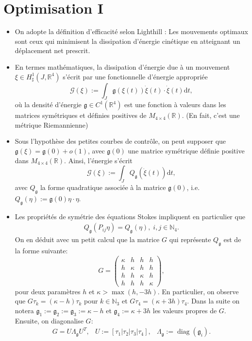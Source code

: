 \documentclass[12pt,a4paper]{article}
\theoremstyle{plain}
\theoremstyle{plain}
\theoremstyle{plain}
\theoremstyle{definition}
\theoremstyle{definition}
\theoremstyle{definition}
\theoremstyle{plain}
\newcommand{\N}{\mathbb{N}}
\newcommand{\R}{\mathbb{R}}
\DeclareMathOperator{\diag}{diag}
\newcommand{\dd}[1]{\mathrm{d}#1}
\begin{document}
\section{Optimisation I}
\begin{itemize}
\item On adopte la définition d'efficacité selon Lighthill \cite{Lighthill1952}: Les mouvements optimaux sont ceux qui minimisent la dissipation d'énergie cinétique en atteignant un déplacement net prescrit.

\item En termes mathématiques, la dissipation d'énergie due à un mouvement $\xi \in H^1_{\sharp}(J, \R^4)$ s'écrit par une fonctionnelle d'énergie appropriée
\begin{equation}
 \mathcal{G}(\xi) := \int_{J} \mathfrak{g}(\xi(t))\dot{\xi}(t) \cdot \dot{\xi}(t) \dd t,
\end{equation}
où la densité d'énergie $\mathfrak{g} \in C^1(\R^4)$ est une fonction à valeurs dans les matrices symétriques et définies positives de $M_{4 \times 4}(\R)$. (En fait, c'est une métrique Riemannienne)

\item Sous l'hypothèse des petites courbes de contrôle, on peut supposer que $\mathfrak{g}(\xi) = \mathfrak{g}(0) + o(1)$, avec $\mathfrak{g}(0)$ une matrice symétrique définie positive dans $M_{4 \times 4}(\R)$. Ainsi, l'énergie s'écrit
\begin{equation}
\label{eq: linearized energy functional}
	\mathcal{G}(\xi) := \int_{J} Q_{\mathfrak{g}}(\dot{\xi}(t))\dd t,
\end{equation}
avec $Q_{\mathfrak{g}}$ la forme quadratique associée à la matrice $\mathfrak{g}(0)$, i.e. $Q_{\mathfrak{g}}(\eta) := \mathfrak{g}(0)\eta \cdot \eta$.

\item Les propriétés de symétrie des équations Stokes impliquent en particulier que
\begin{align}
	Q_{\mathfrak{g}}(P_{ij} \eta) = Q_{\mathfrak{g}}(\eta),\; i,j \in \N_4.
\end{align}
On en déduit avec un petit calcul que la matrice $G$ qui représente $Q_{\mathfrak{g}}$ est de la forme suivante:
\begin{equation}
G = \left ( \begin{array}{cccc}
\kappa & h & h & h \\ 
h & \kappa & h & h \\ 
h & h & \kappa & h \\ 
h & h & h & \kappa
\end{array} \right ),
\end{equation}
pour deux paramètres $h$ et $\kappa > \max(h, -3h)$. En particulier, on observe que $G \tau_k = (\kappa - h ) \tau_k$ pour $k \in  \N_3$ et $G \tau_4 = (\kappa + 3h) \tau_4$. Dans la suite on notera $\mathfrak{g}_1 := \mathfrak{g}_2 := \mathfrak{g}_3 := \kappa - h$ et $\mathfrak{g}_4 := \kappa + 3h$ les valeurs propres de $G$. Ensuite, on diagonalise $G$:
\begin{eqnarray}
G = U \Lambda_{\mathfrak{g}} U^T, & U := [\tau_1 | \tau_2 |\tau_3 |\tau_4], & \Lambda_{\mathfrak{g}} := \diag(\mathfrak{g}_i).
\end{eqnarray}


\end{itemize}
\end{document}
